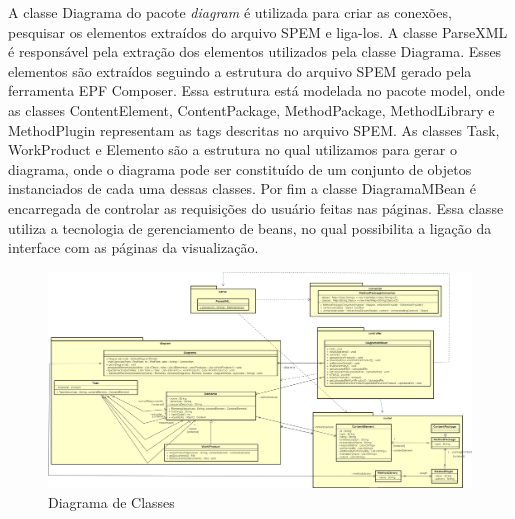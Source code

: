 A classe Diagrama do pacote \textit{diagram} é utilizada para criar as conexões, pesquisar os elementos extraídos do arquivo SPEM e liga-los. A classe ParseXML é responsável pela extração dos elementos utilizados pela classe Diagrama. Esses elementos são extraídos seguindo a estrutura do arquivo SPEM gerado pela ferramenta EPF Composer. Essa estrutura está modelada no pacote model, onde as classes ContentElement, ContentPackage, MethodPackage, MethodLibrary e MethodPlugin representam as tags descritas no arquivo SPEM.
As classes Task, WorkProduct e Elemento são a estrutura no qual utilizamos para gerar o diagrama, onde o diagrama pode ser constituído de um conjunto de objetos instanciados de cada uma dessas classes. Por fim a classe DiagramaMBean é encarregada de controlar as requisições do usuário feitas nas páginas. Essa classe utiliza a tecnologia de gerenciamento de beans, no qual possibilita a ligação da interface com as páginas da visualização.

\begin{figure}[!htb]
	\caption{Diagrama de Classes}\label{figura:diagramaclasses}
	\begin{center}
		\includegraphics[scale=0.2]{img/ferramenta_diagrama_classes}
	\end{center}
\end{figure}


